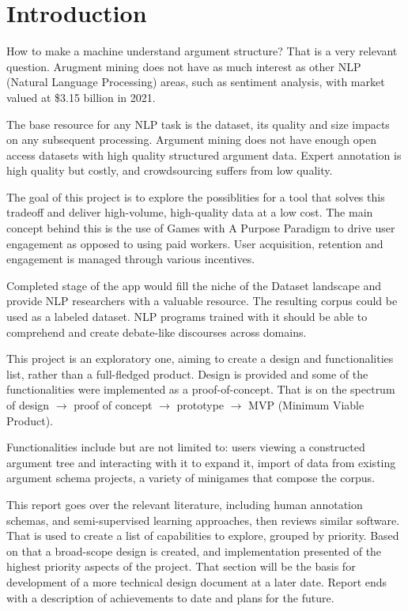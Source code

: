 \documentclass{report}
\begin{document}
\newpage

\tableofcontents

\newpage

\chapter{Introduction}
How to make a machine understand argument structure?
That is a very relevant question. Arugment mining does not have as much interest as other NLP (Natural Language Processing) areas, such as sentiment analysis, with market valued at \$3.15 billion in 2021. \cite{noauthor_sentiment_nodate}

The base resource for any NLP task is the dataset, its quality and size impacts on any subsequent processing. Argument mining does not have enough open access datasets with high quality structured argument data.  Expert annotation is high quality but costly, and crowdsourcing suffers from low quality. 

The goal of this project is to explore the possiblities for a tool that solves this tradeoff and deliver high-volume, high-quality data at a low cost. 
The main concept behind this is the use of Games with A Purpose Paradigm to drive user engagement as opposed to using paid workers. User acquisition, retention and engagement is managed through various incentives. 

Completed stage of the app would fill the niche of the Dataset landscape and provide NLP researchers with a valuable resource.
The resulting corpus could be used as a labeled dataset. NLP programs trained with it should be able to comprehend and create debate-like discourses across domains.

This project is an exploratory one, aiming to create a design and functionalities list, rather than a full-fledged product.
Design is provided and some of the functionalities were implemented as a proof-of-concept. 
That is on the spectrum of design $\rightarrow$ proof of concept $\rightarrow$ prototype $\rightarrow$ MVP (Minimum Viable Product).

Functionalities include but are not limited to: users viewing a constructed argument tree and interacting with it to expand it, import of data from existing argument schema projects, a variety of minigames that compose the corpus. 

This report goes over the relevant literature, including human annotation schemas, and semi-supervised learning approaches, then reviews similar software. That is used to create a list of capabilities to explore, grouped by priority. Based on that a broad-scope design is created, and implementation presented of the highest priority aspects of the project.
That section will be the basis for development of a more technical design document at a later date.
Report ends with a description of achievements to date and plans for the future.
\end{document}
